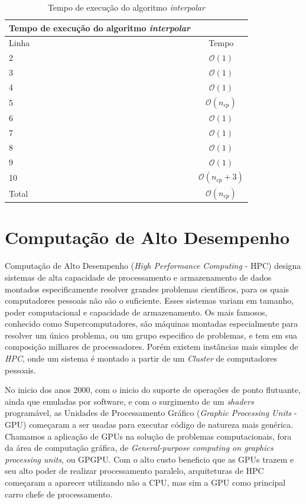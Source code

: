 \begin{table}[H]
\begin{center}
\begin{tabular}{l|c}
\hline
Tempo de execução do algoritmo \textit{interpolar} \\
\hline
Linha&Tempo\\
\hline
2       &$\mathcal{O}(1)$ \\
3       &$\mathcal{O}(1)$ \\
4       &$\mathcal{O}(1)$\\
5       &$\mathcal{O}(n_{cp})$\\
6       &$\mathcal{O}(1)$\\
7       &$\mathcal{O}(1)$\\
8       &$\mathcal{O}(1)$\\
9       &$\mathcal{O}(1)$\\
10      &$\mathcal{O}(n_{cp}+3)$\\
\hline
Total   &$\mathcal{O}(n_{cp})$\\
\hline
\end{tabular}
\caption{Tempo de execução do algoritmo \textit{interpolar}}
\label{table:interpolar}
\end{center}
\end{table}

\section{Computação de Alto Desempenho}\label{GPGPU}

    Computação de Alto Desempenho (\textit{High Performance Computing} - HPC) designa sistemas de alta capacidade de processamento
e armazenamento de dados montados especificamente resolver grandes problemas científicos, para os quais computadores pessoais não
são o suficiente. Esses sistemas variam em tamanho, poder computacional e capacidade de armazenamento. Os mais famosos,
conhecido como Supercomputadores, são máquinas montadas especialmente para resolver um único problema, ou um grupo
especifico de problemas, e tem em sua composição milhares de processadores. Porém existem instâncias mais simples de
\textit{HPC}, onde um sistema é montado a partir de um \textit{Cluster} de computadores pessoais.

    No inicio dos anos 2000, com o inicio do suporte de operações de ponto flutuante, ainda que emuladas por software,
e com o surgimento de um \textit{shaders} programável, as Unidades de Processamento Gráfico
(\textit{Graphic Processing Units} - GPU) começaram a ser usadas para executar código de natureza mais genérica.
Chamamos a aplicação de GPUs na solução de problemas computacionais, fora da área de computação gráfica,
de \textit{General-purpose computing on graphics processing units}, ou GPGPU. Com o alto custo beneficio que as GPUs
trazem e seu alto poder de realizar processamento paralelo, arquiteturas de HPC começaram a aparecer utilizando não a
CPU, mas sim a GPU como principal carro chefe de processamento.

